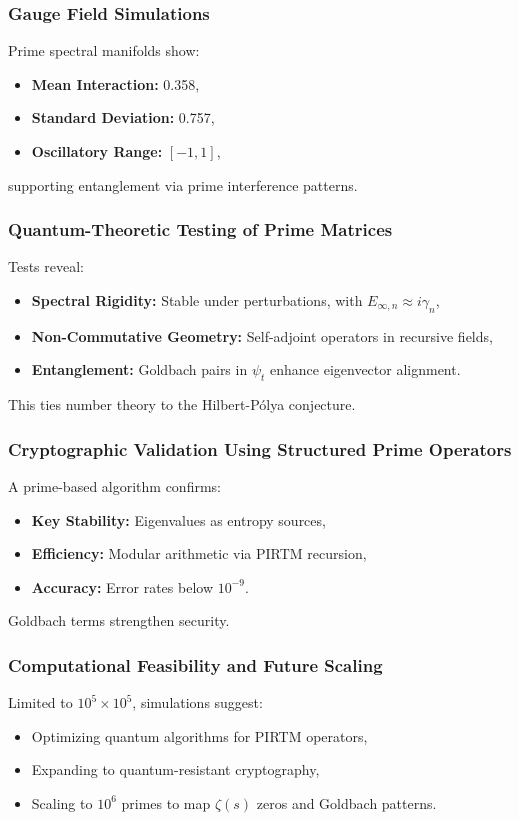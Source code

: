 \documentclass[11pt]{article}
\theoremstyle{plain}
\begin{document}
\subsubsection{Gauge Field Simulations}
Prime spectral manifolds show:
\begin{itemize}
    \item \textbf{Mean Interaction:} 0.358,
    \item \textbf{Standard Deviation:} 0.757,
    \item \textbf{Oscillatory Range:} \([-1, 1]\),
\end{itemize}
supporting entanglement via prime interference patterns.

\subsubsection{Quantum-Theoretic Testing of Prime Matrices}
Tests reveal:
\begin{itemize}
    \item \textbf{Spectral Rigidity:} Stable under perturbations, with \( E_{\infty,n} \approx i \gamma_n \),
    \item \textbf{Non-Commutative Geometry:} Self-adjoint operators in recursive fields,
    \item \textbf{Entanglement:} Goldbach pairs in \( \psi_t \) enhance eigenvector alignment.
\end{itemize}
This ties number theory to the Hilbert-Pólya conjecture.

\subsubsection{Cryptographic Validation Using Structured Prime Operators}
A prime-based algorithm confirms:
\begin{itemize}
    \item \textbf{Key Stability:} Eigenvalues as entropy sources,
    \item \textbf{Efficiency:} Modular arithmetic via PIRTM recursion,
    \item \textbf{Accuracy:} Error rates below \( 10^{-9} \).
\end{itemize}
Goldbach terms strengthen security.

\subsubsection{Computational Feasibility and Future Scaling}
Limited to \( 10^5 \times 10^5 \), simulations suggest:
\begin{itemize}
    \item Optimizing quantum algorithms for PIRTM operators,
    \item Expanding to quantum-resistant cryptography,
    \item Scaling to \( 10^6 \) primes to map \( \zeta(s) \) zeros and Goldbach patterns.
\end{itemize}
\end{document}
